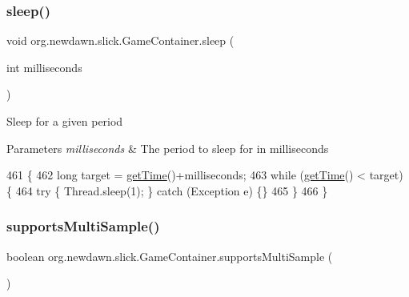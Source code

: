 \subsubsection{\texorpdfstring{sleep()}{sleep()}}
{\footnotesize\ttfamily void org.\+newdawn.\+slick.\+Game\+Container.\+sleep (\begin{DoxyParamCaption}\item[{int}]{milliseconds }\end{DoxyParamCaption})\hspace{0.3cm}{\ttfamily [inline]}}

Sleep for a given period


\begin{DoxyParams}{Parameters}
{\em milliseconds} & The period to sleep for in milliseconds \\
\hline
\end{DoxyParams}

\begin{DoxyCode}
461                                         \{
462         \textcolor{keywordtype}{long} target = \mbox{\hyperlink{classorg_1_1newdawn_1_1slick_1_1_game_container_a1650b161216693ec0b4c0d9d00496c05}{getTime}}()+milliseconds;
463         \textcolor{keywordflow}{while} (\mbox{\hyperlink{classorg_1_1newdawn_1_1slick_1_1_game_container_a1650b161216693ec0b4c0d9d00496c05}{getTime}}() < target) \{
464             \textcolor{keywordflow}{try} \{ Thread.sleep(1); \} \textcolor{keywordflow}{catch} (Exception e) \{\}
465         \}
466     \}
\end{DoxyCode}
\mbox{\label{classorg_1_1newdawn_1_1slick_1_1_game_container_ad9fbc79ea908ad3d82d274e9614747ad}} 
\subsubsection{\texorpdfstring{supports\+Multi\+Sample()}{supportsMultiSample()}}
{\footnotesize\ttfamily boolean org.\+newdawn.\+slick.\+Game\+Container.\+supports\+Multi\+Sample (\begin{DoxyParamCaption}{ }\end{DoxyParamCaption})\hspace{0.3cm}{\ttfamily [inline]}}

